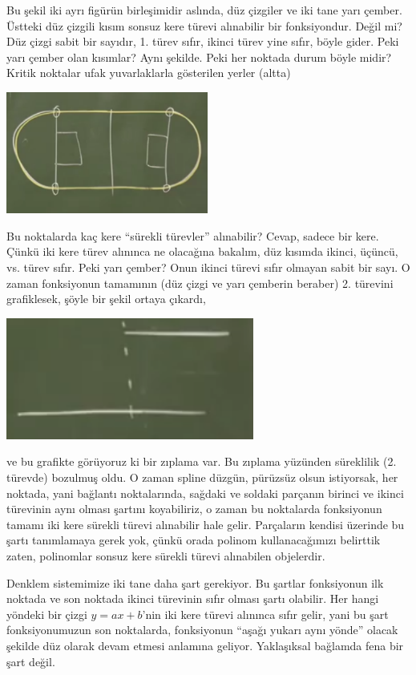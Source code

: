 \documentclass[12pt,fleqn]{article}\usepackage{../../common}
\begin{document}
Bu şekil iki ayrı figürün birleşimidir aslında, düz çizgiler ve iki tane
yarı çember. Üstteki düz çizgili kısım sonsuz kere türevi alınabilir bir
fonksiyondur. Değil mi? Düz çizgi sabit bir sayıdır, 1. türev sıfır, ikinci
türev yine sıfır, böyle gider. Peki yarı çember olan kısımlar? Aynı
şekilde. Peki her noktada durum böyle midir? Kritik noktalar ufak
yuvarlaklarla gösterilen yerler (altta)

\includegraphics[height=4cm]{spline7.png}

Bu noktalarda kaç kere ``sürekli türevler'' alınabilir? Cevap, sadece bir
kere. Çünkü iki kere türev alınınca ne olacağına bakalım, düz kısımda
ikinci, üçüncü, vs. türev sıfır. Peki yarı çember? Onun ikinci türevi sıfır
olmayan sabit bir sayı. O zaman fonksiyonun tamamının (düz çizgi ve yarı
çemberin beraber) 2. türevini grafiklesek, şöyle bir şekil ortaya çıkardı,

\includegraphics[height=4cm]{spline8.png}

ve bu grafikte görüyoruz ki bir zıplama var. Bu zıplama yüzünden süreklilik
(2. türevde) bozulmuş oldu. O zaman spline düzgün, pürüzsüz olsun istiyorsak, her noktada, yani
bağlantı noktalarında, sağdaki ve soldaki parçanın birinci ve ikinci
türevinin aynı olması şartını koyabiliriz, o zaman bu noktalarda
fonksiyonun tamamı iki kere sürekli türevi alınabilir hale
gelir. Parçaların kendisi üzerinde bu şartı tanımlamaya gerek yok, çünkü
orada polinom kullanacağımızı belirttik zaten, polinomlar sonsuz kere
sürekli türevi alınabilen objelerdir. 

Denklem sistemimize iki tane daha şart gerekiyor. Bu şartlar fonksiyonun
ilk noktada ve son noktada ikinci türevinin sıfır olması şartı
olabilir. Her hangi yöndeki bir çizgi $y = ax + b$'nin iki kere türevi
alınınca sıfır gelir, yani bu şart fonksiyonumuzun son noktalarda,
fonksiyonun ``aşağı yukarı aynı yönde'' olacak şekilde düz olarak devam
etmesi anlamına geliyor. Yaklaşıksal bağlamda fena bir şart değil. 
\end{document}
